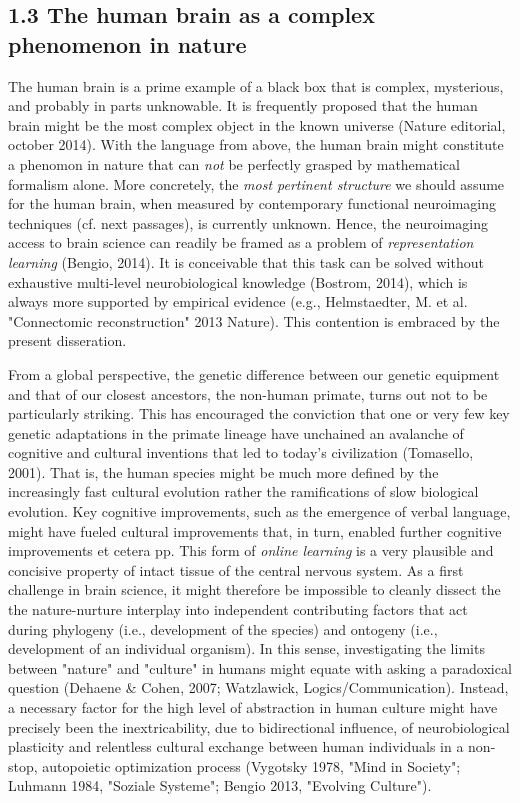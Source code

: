 \documentclass[authoryear,review,3p]{elsarticle}
\begin{document}
\subsection*{1.3 The human brain as a complex phenomenon in nature}
The human brain is a prime example of
a black box that is complex, mysterious, and probably in parts unknowable.
It is frequently proposed that
the human brain might be the most complex object in the known universe
(Nature editorial, october 2014).
With the language from above,
the human brain might constitute a phenomon in nature that
can \textit{not} be perfectly grasped by mathematical formalism alone.
More concretely,
the \textit{most pertinent structure} we should assume for the human brain,
when measured by
contemporary functional neuroimaging techniques (cf. next passages),
is currently unknown.
Hence, the neuroimaging access to brain science can readily be framed as
a problem of \textit{representation learning} (Bengio, 2014).
It is conceivable
that this task can be solved without exhaustive
multi-level neurobiological knowledge (Bostrom, 2014),
which is always more supported by empirical evidence
(e.g., Helmstaedter, M. et al. "Connectomic reconstruction" 2013 Nature).
This contention is embraced by the present disseration.


From a global perspective,
the genetic difference between our genetic equipment and that
of our closest ancestors, the non-human primate, turns out not to be 
particularly striking.
This has encouraged the conviction that one or very few key genetic
adaptations in the primate lineage have unchained an avalanche
of cognitive and cultural inventions that led to today's civilization
(Tomasello, 2001).
That is, the human species might be much more defined by the
increasingly fast cultural evolution rather the ramifications
of slow biological evolution.
Key cognitive improvements, such as the emergence of verbal language,
might have fueled cultural improvements that, in turn, enabled
further cognitive improvements et cetera pp.
This form of \textit{online learning} is a very plausible and concisive
property of intact tissue of the central nervous system.
%
As a first challenge in brain science,
it might therefore be impossible to cleanly dissect the
the nature-nurture interplay into independent contributing factors that act
during
phylogeny (i.e., development of the species)
and
ontogeny (i.e., development of an individual organism).
%
In this sense,
investigating the limits between "nature" and "culture" in humans
might equate with asking a paradoxical question
(Dehaene \& Cohen, 2007; Watzlawick, Logics/Communication).
%
Instead,
a necessary factor for the high level of abstraction in human culture
might have precisely been the inextricability, due to bidirectional influence, of
neurobiological plasticity and relentless cultural exchange
between human individuals
in a non-stop, autopoietic optimization process
(Vygotsky 1978, "Mind in Society"; Luhmann 1984, "Soziale Systeme";
Bengio 2013, "Evolving Culture").
\end{document}
